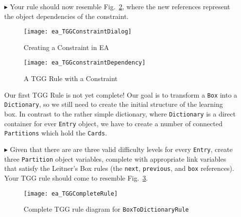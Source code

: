 \begin{enumerate}
\item[$\blacktriangleright$] Your rule should now resemble Fig.~\ref{ea:tgg_rule_with_constraint}, where the new references represent the object dependencies
of the constraint.

\newpage

\begin{figure}[htbp]
\begin{center}
  \texttt{[image: ea\_TGGConstraintDialog]}
  \caption{Creating a Constraint in EA}
  \label{ea:first_tgg_constraint}
\end{center}
\end{figure}

\vspace{1cm}

\begin{figure}[h!]
\begin{center}
  \texttt{[image: ea\_TGGconstraintDependency]}
  \caption{A TGG Rule with a Constraint}
  \label{ea:tgg_rule_with_constraint}
  \end{center}
\end{figure}

\newpage

Our first TGG Rule is not yet complete! Our goal is to transform a \texttt{Box} into a \texttt{Dictionary}, so we still need to create the initial
structure of the learning box. In contrast to the rather simple dictionary, where \texttt{Dictionary} is a direct container for ever \texttt{Entry} object, we
have to create a number of connected \texttt{Partitions} which hold the \texttt{Cards}.

\item[$\blacktriangleright$] Given that there are are three valid difficulty levels for every \texttt{Entry}, create three \texttt{Partition} object variables,
complete with appropriate link variables that satisfy the Leitner's Box rules (the \texttt{next}, \texttt{previous}, and \texttt{box} references). Your TGG rule
should come to resemble Fig.~\ref{ea:boxtodictionaryrule_complete}.


\begin{figure}[htbp]
\begin{center}
  \texttt{[image: ea\_TGGCompleteRule]}
  \caption{Complete TGG rule diagram for \texttt{BoxToDictionaryRule}}
  \label{ea:boxtodictionaryrule_complete}
\end{center}
\end{figure}

\end{enumerate}


